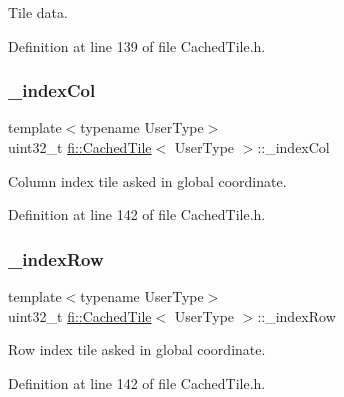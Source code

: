Tile data. 



Definition at line 139 of file Cached\+Tile.\+h.

\mbox{\label{classfi_1_1CachedTile_aa5ba6ea184ad614c488023a3c3e04963}} 
\subsubsection{\texorpdfstring{\+\_\+index\+Col}{\_indexCol}}
{\footnotesize\ttfamily template$<$typename User\+Type$>$ \\
uint32\+\_\+t \hyperlink{classfi_1_1CachedTile}{fi\+::\+Cached\+Tile}$<$ User\+Type $>$\+::\+\_\+index\+Col\hspace{0.3cm}{\ttfamily [protected]}}



Column index tile asked in global coordinate. 



Definition at line 142 of file Cached\+Tile.\+h.

\mbox{\label{classfi_1_1CachedTile_aab0a9c9723c4d318e71e9b8e2fe80e92}} 
\subsubsection{\texorpdfstring{\+\_\+index\+Row}{\_indexRow}}
{\footnotesize\ttfamily template$<$typename User\+Type$>$ \\
uint32\+\_\+t \hyperlink{classfi_1_1CachedTile}{fi\+::\+Cached\+Tile}$<$ User\+Type $>$\+::\+\_\+index\+Row\hspace{0.3cm}{\ttfamily [protected]}}



Row index tile asked in global coordinate. 



Definition at line 142 of file Cached\+Tile.\+h.

\mbox{\label{classfi_1_1CachedTile_ad17f4d3676869cec36d4d03a0c865c1e}} 

